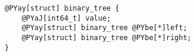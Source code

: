 \begin{Verbatim}[commandchars=@\[\]]
@PYay[struct] binary_tree {
    @PYaJ[int64_t] value;
    @PYay[struct] binary_tree @PYbe[*]left;
    @PYay[struct] binary_tree @PYbe[*]right;
}
\end{Verbatim}
